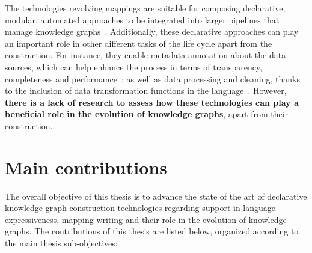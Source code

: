 
The technologies revolving mappings are suitable for composing declarative, modular, automated approaches to be integrated into larger pipelines that manage knowledge graphs~\parencite{simsek2021knowledge,cimmino2022helio,grassi2023composable}. 
Additionally, these declarative approaches can play an important role in other different tasks of the life cycle apart from the construction. 
For instance, they enable metadata annotation about the data sources, which can help enhance the process in terms of transparency, completeness and performance~\parencite{chaves2021morph-csv,vidal2023knowledge}; as well as 
data processing and cleaning, thanks to the inclusion of data transformation functions in the language~\parencite{debruyne2016r2rmlf,junior2016funul,jozashoori2020funmap,DeMeester2017fno_dbpedia}.
However, \textbf{there is a lack of research to assess how these technologies can play a beneficial role in the evolution of knowledge graphs}, apart from their construction.





\section{Main contributions}

The overall objective of this thesis is to advance the state of the art of declarative knowledge graph construction technologies regarding support in language expressiveness, mapping writing and their role in the evolution of knowledge graphs. The contributions of this thesis are listed below, organized according to the main thesis sub-objectives:

